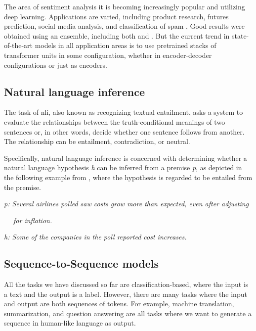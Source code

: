 The area of sentiment analysis it is becoming increasingly popular and utilizing deep learning. Applications are varied, including product research, futures prediction, social media analysis, and classification of spam \cite{ZhengWG18}. 
Good results were obtained using an ensemble, including both  and  \cite{Cliche17}.
But the current trend in state-of-the-art models in all application areas is to use pretrained stacks of transformer units in some configuration, whether in encoder-decoder configurations or just as encoders.


\subsection{Natural language inference}\label{subsec:nli}

The task of \acrfull{nli}, also
known as recognizing textual entailment,
asks a system to evaluate the relationships between
the truth-conditional meanings of two sentences
or, in other words, decide whether one sentence
follows from another.
The relationship can be entailment, contradiction, or neutral.

Specifically, natural language inference
is concerned with determining whether a natural language hypothesis \emph{h} can be inferred from a
premise \emph{p}, as depicted in the following example
from \cite{Manning2009NaturalLI}, where the hypothesis is
regarded to be entailed from the premise.

\emph{p: Several airlines polled saw costs grow more than
expected, even after adjusting}
\par
\emph{$\quad$ for inflation.}
\par
\emph{h: Some of the companies in the poll reported cost
increases.}



\subsection[Seq2Seq]{Sequence-to-Sequence models}\label{subsec:seq2seq}

All the tasks we have discussed so far are classification-based, where the input is a text and the output is a label. However, there are many tasks where the input and output are both sequences of tokens. 
For example, machine translation, summarization, and question answering are all tasks where we want to generate a sequence in human-like language as output.

